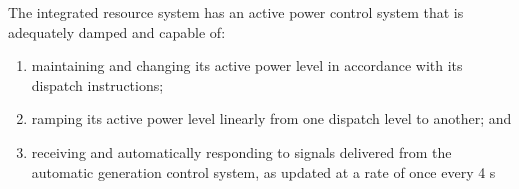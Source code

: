 The integrated resource system has an active power control system that is adequately damped and capable of:
\begin{enumerate}
	\item maintaining and changing its active power level in accordance with its dispatch instructions; 
	\item ramping its active power level linearly from one dispatch level to another; and
	\item receiving and automatically responding to signals delivered from the automatic generation control system, as updated at a rate of once every 4 s  
\end{enumerate}
